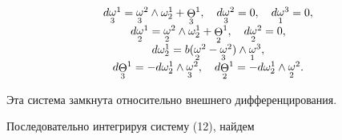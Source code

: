 \begin{equation}


\begin{array}{c}


d{\crazy{\omega}{3}}^{1}= {\crazy{\omega}{3}}^{2} \wedge \omega^{1}_{2}


+{\crazy{\Theta}{3}}^{1},\quad d{\crazy{\omega}{3}}^{2}= 0,


\quad d{\crazy{\omega}{1}}^{3}= 0,\\


%


d{\crazy{\omega}{2}}^{1}={\crazy{\omega}{2}}^{2} \wedge \omega^{1}_{2}


+{\crazy{\Theta}{2}}^{1},\quad d{\crazy{\omega}{2}}^{2}= 0,\\


%


d \omega^{1}_{2}=b({\crazy{\omega}{2}}^{2}-{\crazy{\omega}{3}}^{2})


\wedge {\crazy{\omega}{1}}^{3},\\


%


d{\crazy{\Theta}{3}}^{1}=-d \omega^{1}_{2}


\wedge {\crazy{\omega}{3}}^{2}, \quad


d{\crazy{\Theta}{2}}^{1}=-d \omega^{1}_{2}


\wedge {\crazy{\omega}{2}}^{2}.


\end{array}


\end{equation}


Эта система замкнута относительно внешнего дифференцирования.


Последовательно интегрируя систему (12), найдем


